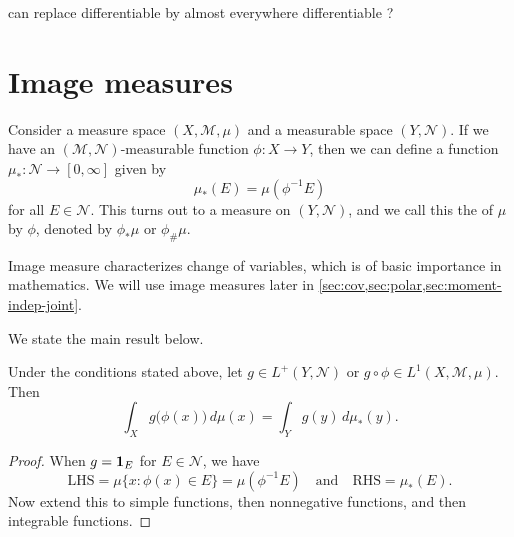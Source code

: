 can replace differentiable by almost everywhere differentiable ? 

\section{Image measures} \label{sec:image-measure}
Consider a measure space $(X,\mathcal{M},\mu)$ and a measurable space $(Y,\mathcal{N})$. If we have an $(\mathcal{M},\mathcal{N})$-measurable function $\phi\colon X \to Y$, then we can define a function $\mu_{*}\colon \mathcal{N} \to [0,\infty]$ given by \[
    \mu_{*}(E) =  \mu(\phi^{-1}E)
\] for all $E\in \mathcal{N}$. This turns out to a measure on $(Y,\mathcal N)$, and we call this the  of $\mu$ by $\phi$, denoted by $\phi_*\mu$ or $\phi_{\#}\mu$.

Image measure characterizes change of variables, which is of basic importance in mathematics. We will use image measures later in \cref{sec:cov,sec:polar,sec:moment-indep-joint}.

We state the main result below.
\begin{prop} \label{prop:image-meas-cov}
    Under the conditions stated above, let $g\in L^+(Y,\mathcal{N})$ or $g \circ \phi \in L^1(X,\mathcal{M},\mu)$. Then \begin{equation*}
        \int_X g\bigl(\phi(x)\bigr) \,d\mu(x) = \int_Y g(y) \,d\mu_*(y). %
    \end{equation*}
\end{prop}
\begin{proof}
    When $g = \mathbf{1}_E$ for $E \in \mathcal{N}$, we have \[
        \text{LHS} = \mu\{x : \phi(x) \in E\} = \mu(\phi^{-1} E) \quad \text{and} \quad 
        \text{RHS} = \mu_{*}(E).
    \] Now extend this to simple functions, then nonnegative functions, and then integrable functions.
\end{proof}